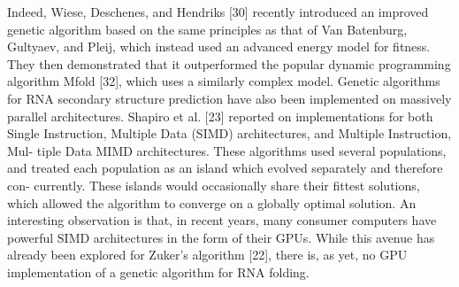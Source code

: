 \documentclass{cshonours}
\begin{document}
Indeed, Wiese, Deschenes, and Hendriks [30] recently introduced an improved
genetic algorithm based on the same principles as that of Van Batenburg, Gultyaev,
and Pleij, which instead used an advanced energy model for fitness. They then
demonstrated that it outperformed the popular dynamic programming algorithm
Mfold [32], which uses a similarly complex model. Genetic algorithms for RNA
secondary structure prediction have also been implemented on massively parallel
architectures. Shapiro et al. [23] reported on implementations for both Single
Instruction, Multiple Data (SIMD) architectures, and Multiple Instruction, Mul-
tiple Data MIMD architectures. These algorithms used several populations, and
treated each population as an island which evolved separately and therefore con-
currently. These islands would occasionally share their fittest solutions, which
allowed the algorithm to converge on a globally optimal solution. An interesting
observation is that, in recent years, many consumer computers have powerful
SIMD architectures in the form of their GPUs. While this avenue has already
been explored for Zuker’s algorithm [22], there is, as yet, no GPU implementation
of a genetic algorithm for RNA folding.
\end{document}
